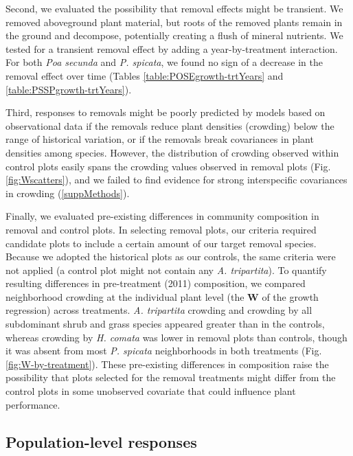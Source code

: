 \documentclass[11pt]{article}
\begin{document}
\begin{doublespacing}
Second, we evaluated the possibility that removal effects might be transient. We removed aboveground plant material, but roots of the removed plants remain in the ground and decompose, potentially creating a flush of mineral nutrients. We tested for a transient removal effect by adding a year-by-treatment interaction. For both  \textit{Poa secunda}  and \textit{P. spicata}, we found no sign of a decrease in the removal effect over time (Tables \ref{table:POSEgrowth-trtYears} and \ref{table:PSSPgrowth-trtYears}).

Third, responses to removals might be poorly predicted by models based on observational data if the removals reduce plant densities (crowding) below the range of historical variation, or if the removals break covariances in plant densities among species. However, the distribution of crowding observed within control plots easily spans the crowding values observed in removal plots (Fig. \ref{fig:Wscatters}), and we failed to find evidence for strong interspecific covariances in crowding (\ref{suppMethods}).

Finally, we evaluated pre-existing differences in community composition in removal and control plots. In selecting removal plots, our criteria required candidate plots to include a certain amount of our target removal species. Because we adopted the historical plots as our controls, the same criteria were not applied (a control plot might not contain any \textit{A. tripartita}). To quantify resulting differences in pre-treatment (2011) composition, we compared neighborhood crowding at the individual plant level (the $\boldsymbol{W}$ of the growth regression) across treatments. \textit{A. tripartita} crowding and crowding by all subdominant shrub and grass species appeared greater than in the controls, whereas crowding by \textit{H. comata} was lower in removal plots than controls, though it was absent from most \textit{P. spicata} neighborhoods in both treatments (Fig. \ref{fig:W-by-treatment}). These pre-existing differences in composition raise the possibility that plots selected for the removal treatments might differ from the control plots in some unobserved covariate that could influence plant performance.

\subsection*{Population-level responses}


\end{doublespacing}
\end{document}
